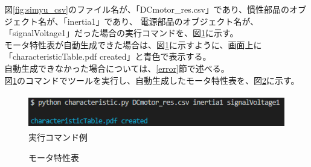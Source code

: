 図\ref{fig:simyu_csv}のファイル名が、「DCmotor\_res.csv」であり、慣性部品のオブジェクト名が、「inertia1」であり、
電源部品のオブジェクト名が、「signalVoltage1」だった場合の実行コマンドを、図\ref{fig:zikkou}に示す。\\
モータ特性表が自動生成できた場合は、図\ref{fig:zikkou}に示すように、画面上に「characteristicTable.pdf created」と青色で表示する。\\
自動生成できなかった場合については、\ref{error}節で述べる。\\
図\ref{fig:zikkou}のコマンドでツールを実行し、自動生成したモータ特性表を、図\ref{fig:tokuseihyou}に示す。
\begin{figure}[t]
	\centering
	\includegraphics[width=12cm,height=1.5cm]{./Image/succes_comand.png}
	\caption{実行コマンド例}
	\label{fig:zikkou}
\end{figure}
\begin{figure}[t]
	\centering
	\caption{モータ特性表}
	\label{fig:tokuseihyou}
\end{figure}
